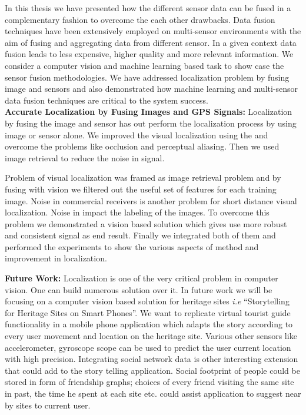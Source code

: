 In this thesis we have presented how the different sensor data can be fused in a complementary fashion to overcome the each other drawbacks. Data fusion techniques have been extensively employed on multi-sensor environments with the aim of fusing and aggregating data from different sensor. In a given context data fusion leads to less expensive, higher quality and more relevant information. We consider a computer vision and machine learning based task to show case the sensor fusion methodologies. We have addressed localization problem by fusing image and \gps sensors and also demonstrated how machine learning and multi-sensor data fusion techniques are critical to the system success.\\

\textbf{Accurate Localization by Fusing Images and GPS Signals:} Localization by fusing the image and \gps sensor has out perform the localization process by using image or \gps sensor alone. We improved the visual localization using the \gps and overcome the problems like occlusion and perceptual aliasing. Then we used image retrieval to reduce the noise in \gps signal.

Problem of visual localization was framed as image retrieval problem and by fusing \gps with vision we filtered out the useful set of features for each training image. Noise in commercial \gps receivers is another problem for short distance visual localization. Noise in \gps impact the labeling of the images. To overcome this problem we demonstrated a vision based solution which gives use more robust and consistent \gps signal as end result. Finally we integrated both of them and performed the experiments to show the various
aspects of method and improvement in localization.

\textbf{Future Work:}
Localization is one of the very critical problem in computer vision. One can build numerous solution over it. In future work we will be focusing on a computer vision based solution for heritage sites {\em i.e} ``Storytelling for Heritage Sites on Smart Phones''. We want to replicate virtual tourist guide functionality in a mobile phone application which adapts the story according to every user
movement and location on the heritage site. Various other sensors like accelerometer, gyroscope scope can be used to predict the user current location with high precision. Integrating social network data
is other interesting extension that could add to the story telling application. Social footprint of people could be stored in form of friendship graphs; choices of every friend
visiting the same site in past, the time he spent at each site etc. could assist application to suggest near by sites to current user.\\

